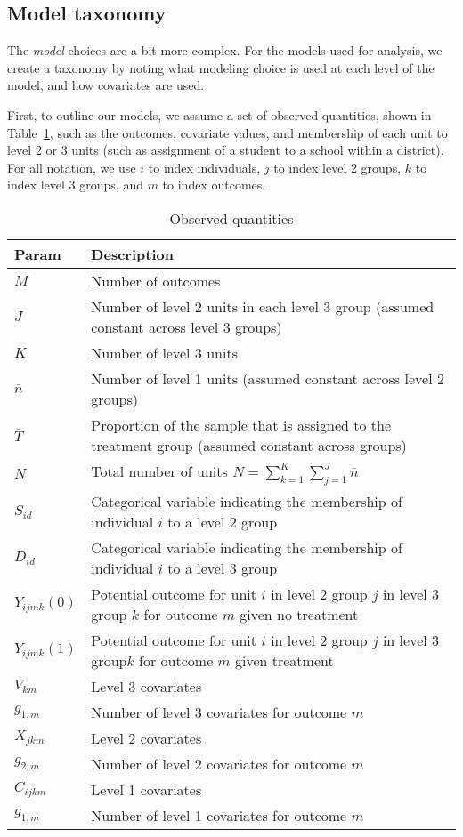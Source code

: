 \documentclass[12pt]{article}
\begin{document}
\subsection{Model taxonomy}

The \emph{model} choices are a bit more complex.
For the models used for analysis, we create a taxonomy by noting what modeling choice is used at each level of the model, and how covariates are used.

First, to outline our models, we assume a set of observed quantities, shown in Table~\ref{tab:observed_param}, such as the outcomes, covariate values, and membership of each unit to level 2 or 3 units (such as assignment of a student to a school within a district).
For all notation, we use $i$ to index individuals, $j$ to index level 2 groups, $k$ to index level 3 groups, and $m$ to index outcomes.

\begin{table}[h]
\begin{tabular}{p{1.5cm} | p{16cm}}
Param											& Description \\ \hline
$M$												& Number of outcomes \\
$J$												& Number of level 2 units in each level 3 group (assumed constant across level 3 groups) \\
$K$												& Number of level 3 units \\
$\bar{n}$										& Number of level 1 units (assumed constant across level 2 groups) \\
$\bar{T}$										& Proportion of the sample that is assigned to the treatment group (assumed constant across groups) \\
$N$												& Total number of units $N =\sum_{k=1}^{K} \sum_{j=1}^{J}  \bar{n}$ \\ \hline
$S_{id}$										& Categorical variable indicating the membership of individual $i$ to a level 2 group\\
$D_{id}$										& Categorical variable indicating the membership of individual $i$ to a level 3 group\\ \hline
$Y_{ijmk}(0)$									& Potential outcome for unit $i$ in level 2 group $j$ in level 3 group $k$ for outcome $m$ given no treatment\\
$Y_{ijmk}(1)$									& Potential outcome for unit $i$ in level 2 group $j$ in level 3 group$k$ for outcome $m$ given treatment\\ \hline
$V_{km}$										& Level 3 covariates \\
$g_{1,m}$										& Number of level 3 covariates for outcome $m$\\
$X_{jkm}$										& Level 2 covariates \\
$g_{2,m}$										& Number of level 2 covariates for outcome $m$\\
$C_{ijkm}$										& Level 1 covariates \\
$g_{1,m}$										& Number of level 1 covariates for outcome $m$\\
\end{tabular}
\caption{Observed quantities\label{tab:observed_param}}
\end{table}
\end{document}
